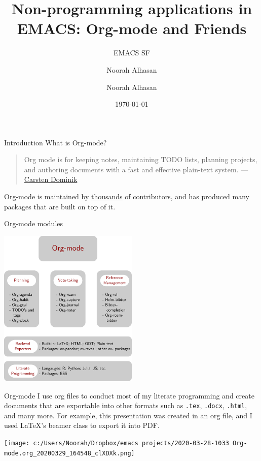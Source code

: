 \documentclass[presentation]{beamer}
\subtitle{EMACS SF}
\author{Noorah Alhasan}
\author{Noorah Alhasan}
\date{\today}
\title{Non-programming applications in EMACS: Org-mode and Friends}
\begin{document}
\maketitle


\begin{frame}[label={sec:org549aeee}]{Introduction}
What is Org-mode?
\begin{quote}
Org mode is for keeping notes, maintaining TODO lists, planning projects, and authoring documents with a fast and effective plain-text system. --- \href{https://orgmode.org/}{Carsten Dominik}
\end{quote}
Org-mode is maintained by \href{https://orgmode.org/org.html\#History-and-Acknowledgments}{thousands} of contributors, and has produced many packages that are built on top of it.
\end{frame}
\begin{frame}[label={sec:orgf9c828e}]{Org-mode modules}
\begin{center}
\includegraphics[width=0.5\textwidth]{org-mode.png}
\end{center}
\end{frame}



\begin{frame}[label={sec:org74ff8ab},fragile]{Org-mode}
 I use org files to conduct most of my literate programming and create documents that are exportable into other formats such as \texttt{.tex}, \texttt{.docx}, \texttt{.html}, and many more. For example, this presentation was created in an org file, and I used LaTeX's beamer class to export it into PDF.

\begin{center}
\texttt{[image: c:/Users/Noorah/Dropbox/emacs projects/2020-03-28-1033 Org-mode.org\_20200329\_164548\_clXDXk.png]}
\end{center}
\end{frame}
\end{document}
